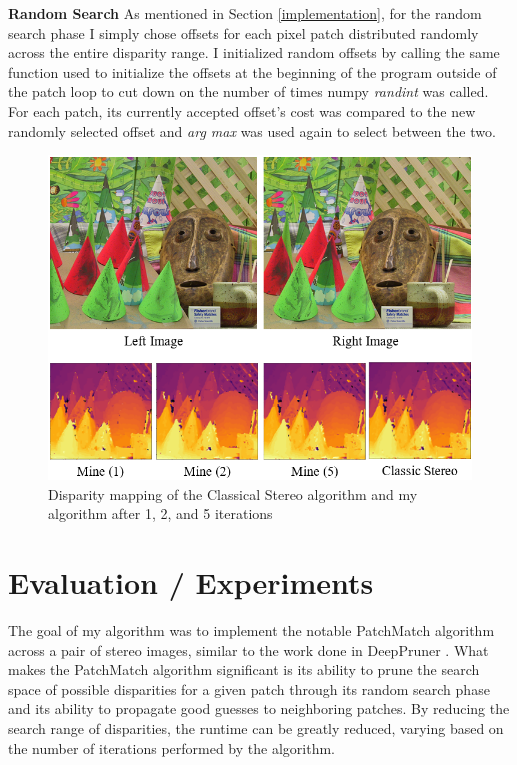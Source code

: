 \documentclass{article}
\begin{document}
\textbf{Random Search} As mentioned in Section \ref{implementation}, for the random search phase I simply chose offsets for each pixel patch distributed randomly across the entire disparity range. I initialized random offsets by calling the same function used to initialize the offsets at the beginning of the program outside of the patch loop to cut down on the number of times numpy \textit{randint} was called. For each patch, its currently accepted offset’s cost was compared to the new randomly selected offset and \textit{arg max} was used again to select between the two.
\begin{figure}[ht]
\vskip 0.0in
\begin{center}
\centerline{\includegraphics[width=\columnwidth]{Experiment.png}}
\caption{Disparity mapping of the Classical Stereo algorithm and my algorithm after 1, 2, and 5 iterations}
\label{experiment}
\end{center}
\vskip -0.2in
\end{figure}
\section{Evaluation / Experiments}
\label{evaluation}
The goal of my algorithm was to implement the notable PatchMatch \citep{barnes2009patchmatch} algorithm across a pair of stereo images, similar to the work done in DeepPruner \citep{duggal2019deeppruner}. What makes the PatchMatch algorithm significant is its ability to prune the search space of possible disparities for a given patch through its random search phase and its ability to propagate good guesses to neighboring patches. By reducing the search range of disparities, the runtime can be greatly reduced, varying based on the number of iterations performed by the algorithm.
\end{document}
